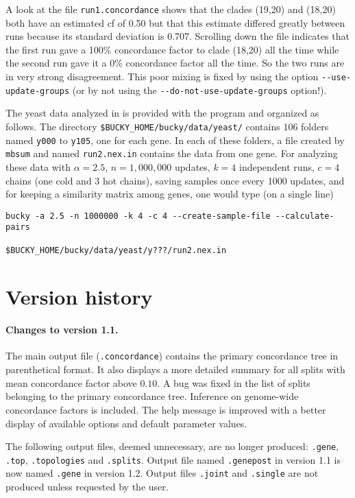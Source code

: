 \documentclass[12pt,english,final,letterpaper]{article}
\begin{document}
A look at the file {\tt run1.concordance} shows that the clades (19,20) and
(18,20) both have an estimated {\sc cf} of 0.50 but that this estimate differed
greatly between runs because its standard deviation is 0.707. Scrolling down
the file indicates that the first run gave a 100\% concordance factor to clade
(18,20) all the time while the second run gave it a 0\% concordance factor 
all the time.
So the two runs are in very strong disagreement. 
This poor mixing is fixed by using the option
\verb+--use-update-groups+ (or by not using the 
\verb+--do-not-use-update-groups+ option!).
\medskip

The yeast data analyzed in \cite{ane-etal-2007} is provided with the program
and organized as follows. The directory
\verb+$BUCKY_HOME/bucky/data/yeast/+ %
contains 106 folders named {\tt y000} to {\tt y105}, one for each gene. 
In each of these folders, a file created by {\tt mbsum} and named 
{\tt run2.nex.in} contains the data from one gene.
For analyzing these data with $\alpha=2.5$, 
$n=1,000,000$ updates, $k=4$ independent runs, $c=4$ chains (one cold and 3 hot chains),
saving samples once every 1000 updates, and for keeping a similarity 
matrix among genes, one would type (on a single line)
\begin{verbatim}
bucky -a 2.5 -n 1000000 -k 4 -c 4 --create-sample-file --calculate-pairs
                           $BUCKY_HOME/bucky/data/yeast/y???/run2.nex.in
\end{verbatim}%
    
\section{Version history}
\paragraph{Changes to version 1.1.}
The main output file ({\tt .concordance}) contains the primary concordance
tree in parenthetical format. It also displays a more detailed summary
for all splits with mean concordance factor above $0.10$. 
A bug was fixed in the list of splits belonging to the
primary concordance tree. Inference on genome-wide concordance factors is
included.
The help message is improved with a better display of available options and
default parameter values.

\smallskip

The following output files, deemed unnecessary, are no longer produced:
{\tt .gene}, {\tt .top}, {\tt .topologies} and {\tt .splits}. 
Output file named {\tt .genepost} in version 1.1 is now named 
{\tt .gene} in version 1.2. 
Output files {\tt .joint} and {\tt .single} are not produced unless
requested by the user.
\end{document}
